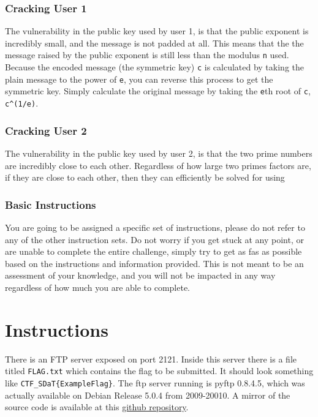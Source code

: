 {{                        \subsubsection*{Cracking User 1}
                            The vulnerability in the public key used by user 1, is that the public exponent is incredibly small, and the message is not padded at all. %
This means that the the message raised by the public exponent is still less than the modulus \lstinline`n` used. %
Because the encoded message (the symmetric key) \lstinline`c` is calculated by taking the plain message to the power of \lstinline`e`, you can reverse this process to get the symmetric key. %
Simply calculate the original message by taking the \lstinline`e`th root of \lstinline`c`, \lstinline`c^(1/e)`.
                        \subsubsection*{Cracking User 2}
                            The vulnerability in the public key used by user 2, is that the two prime numbers are incredibly close to each other. %
Regardless of how large two primes factors are, if they are close to each other, then they can efficiently be solved for using \href{https://en.wikipedia.org/wiki/Fermat
                    \textbf{\textit{As a final reminder, please do not look at the other instructions.}}
            }
\newpage
{}\label{subsec:CTFs-gb}


    \label{subsubsec:CTFs-gb-instructions}

        \subsubsection{Basic Instructions}
            {\parindent0pt\singlespacing
                You are going to be assigned a specific set of instructions, please do not refer to any of the other instruction sets.
                Do not worry if you get stuck at any point, or are unable to complete the entire challenge, simply try to get as fas as possible based on the instructions and information provided. %
This is not meant to be an assessment of your knowledge, and you will not be impacted in any way regardless of how much you are able to complete. 

                \section*{Instructions}
                    There is an FTP server exposed on port 2121. %
Inside this server there is a file titled \lstinline`FLAG.txt` which contains the flag to be submitted. %
It should look something like \lstinline`CTF_SDaT{ExampleFlag}`. %
The ftp server running is pyftp 0.8.4.5, which was actually available on Debian Release 5.0.4 from 2009-20010. %
A mirror of the source code is available at this \href{https://github.com/brendonky18/pyftpd-0.8.4.5_mirror}{github repository}.

}}}

